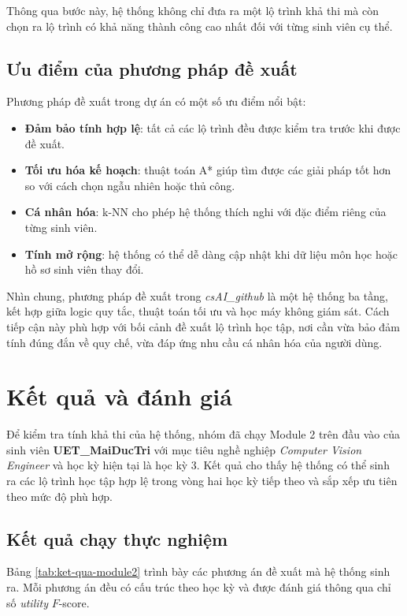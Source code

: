 Thông qua bước này, hệ thống không chỉ đưa ra một lộ trình khả thi mà còn chọn ra lộ trình có khả năng thành công cao nhất đối với từng sinh viên cụ thể.

\subsection{Ưu điểm của phương pháp đề xuất}

Phương pháp đề xuất trong dự án có một số ưu điểm nổi bật:
\begin{itemize}
    \item \textbf{Đảm bảo tính hợp lệ}: tất cả các lộ trình đều được kiểm tra trước khi được đề xuất.
    \item \textbf{Tối ưu hóa kế hoạch}: thuật toán A* giúp tìm được các giải pháp tốt hơn so với cách chọn ngẫu nhiên hoặc thủ công.
    \item \textbf{Cá nhân hóa}: k-NN cho phép hệ thống thích nghi với đặc điểm riêng của từng sinh viên.
    \item \textbf{Tính mở rộng}: hệ thống có thể dễ dàng cập nhật khi dữ liệu môn học hoặc hồ sơ sinh viên thay đổi.
\end{itemize}

Nhìn chung, phương pháp đề xuất trong \textit{csAI\_github} là một hệ thống ba tầng, kết hợp giữa logic quy tắc, thuật toán tối ưu và học máy không giám sát. Cách tiếp cận này phù hợp với bối cảnh đề xuất lộ trình học tập, nơi cần vừa bảo đảm tính đúng đắn về quy chế, vừa đáp ứng nhu cầu cá nhân hóa của người dùng.

\section{Kết quả và đánh giá}
\label{sec:ket_qua_danh_gia}

Để kiểm tra tính khả thi của hệ thống, nhóm đã chạy Module 2 trên đầu vào của sinh viên \textbf{UET\_MaiDucTri} với mục tiêu nghề nghiệp \textit{Computer Vision Engineer} và học kỳ hiện tại là học kỳ 3. Kết quả cho thấy hệ thống có thể sinh ra các lộ trình học tập hợp lệ trong vòng hai học kỳ tiếp theo và sắp xếp ưu tiên theo mức độ phù hợp.

\subsection{Kết quả chạy thực nghiệm}

Bảng \ref{tab:ket-qua-module2} trình bày các phương án đề xuất mà hệ thống sinh ra. Mỗi phương án đều có cấu trúc theo học kỳ và được đánh giá thông qua chỉ số \textit{utility} $F$-score.


